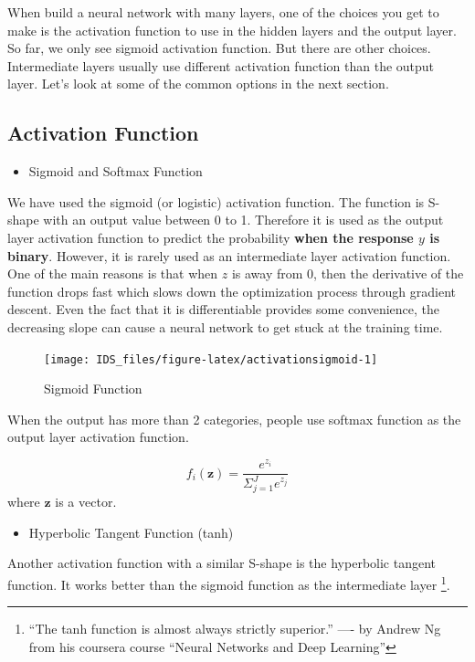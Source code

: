 \documentclass[12pt,]{krantz}
\providecommand{\tightlist}{%
  \setlength{\itemsep}{0pt}\setlength{\parskip}{0pt}}
\begin{document}
When build a neural network with many layers, one of the choices you get to make is the activation function to use in the hidden layers and the output layer. So far, we only see sigmoid activation function. But there are other choices. Intermediate layers usually use different activation function than the output layer. Let's look at some of the common options in the next section.

\hypertarget{activation-function}{%
\subsection{Activation Function}\label{activation-function}}

\begin{itemize}
\tightlist
\item
  Sigmoid and Softmax Function
\end{itemize}

We have used the sigmoid (or logistic) activation function. The function is S-shape with an output value between 0 to 1. Therefore it is used as the output layer activation function to predict the probability \textbf{when the response \(y\) is binary}. However, it is rarely used as an intermediate layer activation function. One of the main reasons is that when \(z\) is away from 0, then the derivative of the function drops fast which slows down the optimization process through gradient descent. Even the fact that it is differentiable provides some convenience, the decreasing slope can cause a neural network to get stuck at the training time.

\begin{figure}

{\centering \texttt{[image: IDS\_files/figure-latex/activationsigmoid-1]} 

}

\caption{Sigmoid Function}\label{fig:activationsigmoid}
\end{figure}

When the output has more than 2 categories, people use softmax function as the output layer activation function.

\[f_i(\mathbf{z}) = \frac{e^{z_i}}{\Sigma_{j=1}^{J} e^{z_j} } \]
where \(\mathbf{z}\) is a vector.

\begin{itemize}
\tightlist
\item
  Hyperbolic Tangent Function (tanh)
\end{itemize}

Another activation function with a similar S-shape is the hyperbolic tangent function. It works better than the sigmoid function as the intermediate layer \footnote{``The tanh function is almost always strictly superior.'' ---- by Andrew Ng from his coursera course ``Neural Networks and Deep Learning''}.
\end{document}
